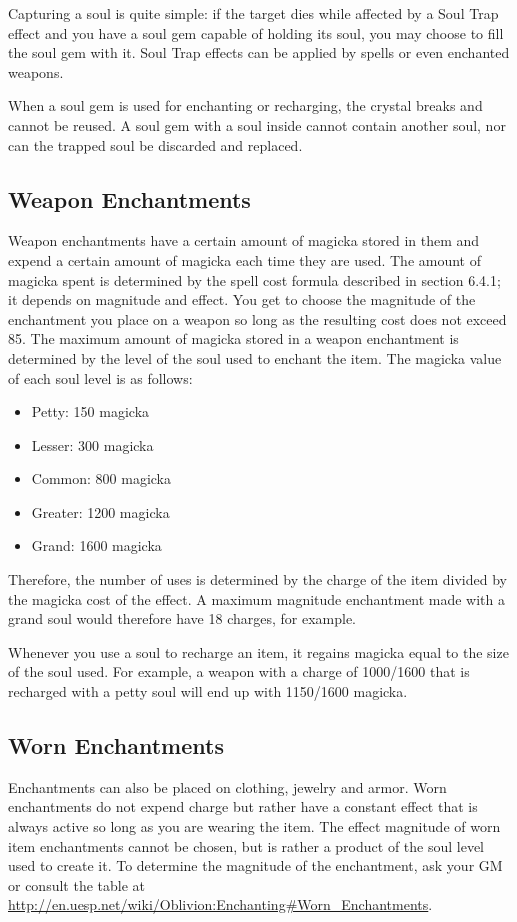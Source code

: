 \documentclass[12pt]{book}
\begin{document}
Capturing a soul is quite simple: if the target dies while affected by a Soul Trap effect and you have a soul gem capable of holding its soul, you may choose to fill the soul gem with it. Soul Trap effects can be applied by spells or even enchanted weapons.

When a soul gem is used for enchanting or recharging, the crystal breaks and cannot be reused. A soul gem with a soul inside cannot contain another soul, nor can the trapped soul be discarded and replaced.

\subsection{Weapon Enchantments}
Weapon enchantments have a certain amount of magicka stored in them and expend a certain amount of magicka each time they are used. The amount of magicka spent is determined by the spell cost formula described in section 6.4.1; it depends on magnitude and effect. You get to choose the magnitude of the enchantment you place on a weapon so long as the resulting cost does not exceed 85. The maximum amount of magicka stored in a weapon enchantment is determined by the level of the soul used to enchant the item. The magicka value of each soul level is as follows:

\begin{itemize}
	\item Petty: 150 magicka
	\item Lesser: 300 magicka
	\item Common: 800 magicka
	\item Greater: 1200 magicka
	\item Grand: 1600 magicka
\end{itemize}

Therefore, the number of uses is determined by the charge of the item divided by the magicka cost of the effect. A maximum magnitude enchantment made with a grand soul would therefore have 18 charges, for example. 

Whenever you use a soul to recharge an item, it regains magicka equal to the size of the soul used. For example, a weapon with a charge of 1000/1600 that is recharged with a petty soul will end up with 1150/1600 magicka.

\subsection{Worn Enchantments}
Enchantments can also be placed on clothing, jewelry and armor. Worn enchantments do not expend charge but rather have a constant effect that is always active so long as you are wearing the item. The effect magnitude of worn item enchantments cannot be chosen, but is rather a product of the soul level used to create it. To determine the magnitude of the enchantment, ask your GM or consult the table at \url{http://en.uesp.net/wiki/Oblivion:Enchanting#Worn_Enchantments}.
\end{document}
